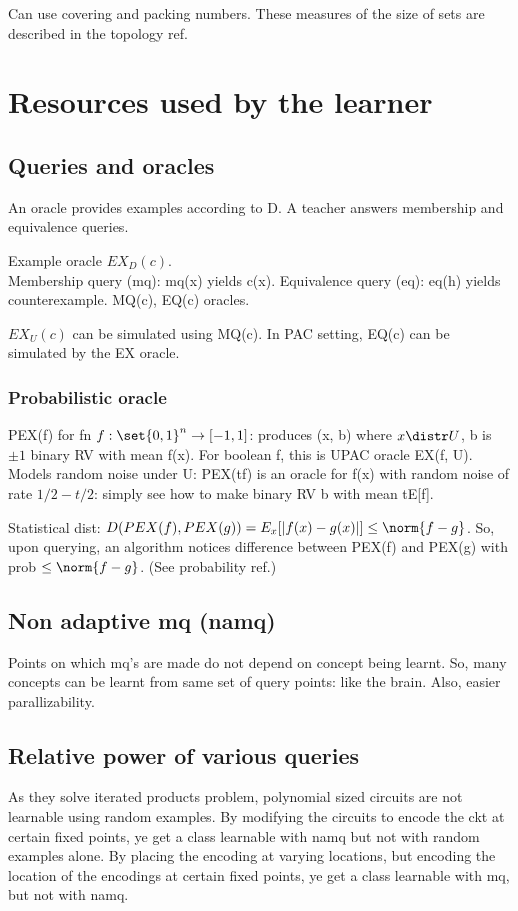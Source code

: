 \documentclass[oneside, article]{memoir}
\begin{document}
Can use covering and packing numbers. These measures of the size of sets are described in the topology ref.

\chapter{Resources used by the learner}
\section{Queries and oracles}
An oracle provides examples according to D. A teacher answers membership and equivalence queries.

Example oracle $EX_D(c)$. \\
Membership query (mq): mq(x) yields c(x). Equivalence query (eq): eq(h) yields counterexample. MQ(c), EQ(c) oracles.

$EX_U(c)$ can be simulated using MQ(c). In PAC setting, EQ(c) can be simulated by the EX oracle.

\subsection{Probabilistic oracle}
PEX(f) for fn $f:\set{0, 1}^n \to [-1, 1]$: produces (x, b) where $x \distr U$, b is $\pm 1$ binary RV with mean f(x). For boolean f, this is UPAC oracle EX(f, U). Models random noise under U: PEX(tf) is an oracle for f(x) with random noise of rate $1/2-t/2$: simply see how to make binary RV b with mean tE[f].

Statistical dist: $D(PEX(f), PEX(g)) = E_x[|f(x)-g(x)|] \leq \norm{f-g}$. So, upon querying, an algorithm notices difference between PEX(f) and PEX(g) with prob $\leq \norm{f-g}$. (See probability ref.)

\section{Non adaptive mq (namq)}
Points on which mq's are made do not depend on concept being learnt. So, many concepts can be learnt from same set of query points: like the brain. Also, easier parallizability.

\section{Relative power of various queries}
As they solve iterated products problem, polynomial sized circuits are not learnable using random examples. By modifying the circuits to encode the ckt at certain fixed points, ye get a class learnable with namq but not with random examples alone. By placing the encoding at varying locations, but encoding the location of the encodings at certain fixed points, ye get a class learnable with mq, but not with namq.
\end{document}
